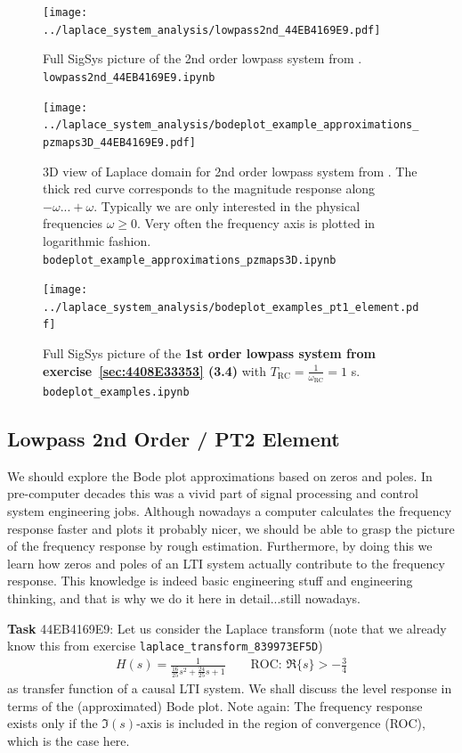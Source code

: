 \begin{figure}
  \texttt{[image: ../laplace\_system\_analysis/lowpass2nd\_44EB4169E9.pdf]}
  \caption{Full SigSys picture of the 2nd order lowpass system from
  . \texttt{lowpass2nd\_44EB4169E9.ipynb}}
  \label{fig:lowpass2nd_44EB4169E9}
\end{figure}


\begin{figure}
  \texttt{[image: ../laplace\_system\_analysis/bodeplot\_example\_approximations\_pzmaps3D\_44EB4169E9.pdf]}
  \caption{3D view of Laplace domain for 2nd order lowpass system from
  .
  The thick red curve corresponds to the magnitude response along $-\omega...+\omega$.
  Typically we are only interested in the physical frequencies $\omega\geq0$.
  Very often the frequency axis is plotted in logarithmic fashion.
  \texttt{bodeplot\_example\_approximations\_pzmaps3D.ipynb}}
  \label{fig:bodeplot_example_approximations_pzmaps3D_44EB4169E9}
\end{figure}




\begin{figure}
  \texttt{[image: ../laplace\_system\_analysis/bodeplot\_examples\_pt1\_element.pdf]}
  \caption{Full SigSys picture of the \textbf{1st order lowpass system from
  exercise~\ref{sec:4408E33353} (3.4)} with $T_\mathrm{RC} = \frac{1}{\omega_\mathrm{RC}} = 1$ s.
  \texttt{bodeplot\_examples.ipynb}}
  \label{fig:bodeplot_examples_pt1_element}
\end{figure}



\newpage
\subsection{Lowpass 2nd Order / PT2 Element}
\label{sec:44EB4169E9}
\begin{Ziel}
We should explore the Bode plot approximations based on zeros and poles.
In pre-computer decades this was a vivid part of signal
processing and control system engineering jobs.
Although nowadays a computer calculates the frequency response faster and plots it
probably nicer, we should be able to grasp the picture of the frequency response
by rough estimation. Furthermore, by doing this we learn how zeros and poles
of an LTI system actually  contribute to the frequency response. This knowledge
is indeed basic engineering stuff and engineering thinking, and that is why we do
it here in detail...still nowadays.
\end{Ziel}
\textbf{Task} {\tiny 44EB4169E9}:
Let us consider the Laplace transform (note that we already know this from
exercise \texttt{laplace\_transform\_839973EF5D})
\begin{align}
\label{eq:H_ODE}
H(s) = \frac{1}{\frac{16}{25} s^2 + \frac{24}{25} s + 1}\qquad\text{ROC: }
\Re\{s\}>-\frac{3}{4}
\end{align}
as transfer function of a causal LTI system.
%
We shall discuss the level response in terms of the (approximated) Bode plot.
%
Note again: The frequency response exists only if the $\Im(s)$-axis is included
in the region of convergence (ROC), which is the case here.

